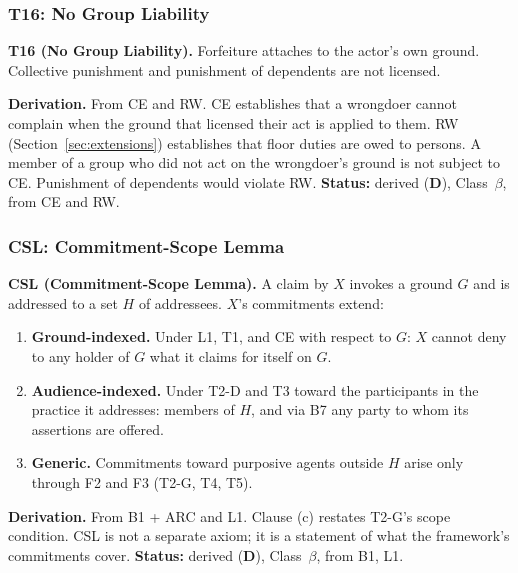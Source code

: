 \documentclass[11pt]{article}
\def\mathcal#1{#1}%
\newcommand{\statusD}{\textcolor{stD}{\textbf{D}}}
\newcommand{\cb}{\texorpdfstring{Class~$\beta$}{Class beta}}
\begin{document}
\subsubsection{T16: No Group Liability}
\begin{paperbox}
\textbf{T16 (No Group Liability).} Forfeiture attaches to the actor's own ground. Collective punishment and punishment of dependents are not licensed.
\end{paperbox}
\textbf{Derivation.} From CE and RW. CE establishes that a wrongdoer cannot complain when the ground that licensed their act is applied to them. RW (Section~\ref{sec:extensions}) establishes that floor duties are owed to persons. A member of a group who did not act on the wrongdoer's ground is not subject to CE. Punishment of dependents would violate RW. \textbf{Status:} derived (\statusD{}), \cb{}, from CE and RW.

\subsubsection{CSL: Commitment-Scope Lemma}
\begin{paperbox}
\textbf{CSL (Commitment-Scope Lemma).} A claim by $X$ invokes a ground $G$ and is addressed to a set $\mathcal{H}$ of addressees. $X$'s commitments extend:
\begin{enumerate}[label=(\alph*)]
\item \textbf{Ground-indexed.} Under L1, T1, and CE with respect to $G$: $X$ cannot deny to any holder of $G$ what it claims for itself on $G$.
\item \textbf{Audience-indexed.} Under T2-D and T3 toward the participants in the practice it addresses: members of $\mathcal{H}$, and via B7 any party to whom its assertions are offered.
\item \textbf{Generic.} Commitments toward purposive agents outside $\mathcal{H}$ arise only through F2 and F3 (T2-G, T4, T5).
\end{enumerate}
\end{paperbox}
\textbf{Derivation.} From B1 + ARC and L1. Clause (c) restates T2-G's scope condition. CSL is not a separate axiom; it is a statement of what the framework's commitments cover. \textbf{Status:} derived (\statusD{}), \cb{}, from B1, L1.
\end{document}
